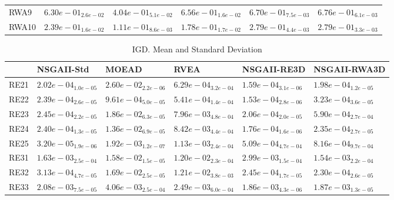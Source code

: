 \documentclass{article}
\begin{document}
\begin{table}
\begin{scriptsize}
\begin{tabular}{llllll}
RWA9 & $  6.30e-01_{ 2.6e-02}$ & $  4.04e-01_{ 5.1e-02}$ & $  6.56e-01_{ 1.6e-02}$ & \cellcolor{gray25}$  6.70e-01_{ 7.5e-03}$ & \cellcolor{gray95}$  6.76e-01_{ 6.1e-03}$ \\
RWA10 & $  2.39e-01_{ 1.6e-02}$ & $  1.11e-01_{ 8.6e-03}$ & $  1.78e-01_{ 1.7e-02}$ & \cellcolor{gray25}$  2.79e-01_{ 4.4e-03}$ & \cellcolor{gray95}$  2.79e-01_{ 3.3e-03}$ \\
\hline
\end{tabular}
\end{scriptsize}
\end{table}

\begin{table}
\caption{IGD. Mean and Standard Deviation}
\label{table: IGD}
\centering
\begin{scriptsize}
\begin{tabular}{llllll}
\hline & NSGAII-Std & MOEAD & RVEA & NSGAII-RE3D &  NSGAII-RWA3D\\
\hline 
RE21 & $  2.02e-04_{ 1.0e-05}$ & $  2.60e-02_{ 2.2e-06}$ & $  6.29e-04_{ 3.2e-04}$ & \cellcolor{gray95}$  1.59e-04_{ 3.1e-06}$ & \cellcolor{gray25}$  1.98e-04_{ 1.2e-05}$ \\
RE22 & \cellcolor{gray25}$  2.39e-04_{ 2.6e-05}$ & $  9.61e-04_{ 5.0e-05}$ & $  5.41e-04_{ 1.4e-04}$ & \cellcolor{gray95}$  1.53e-04_{ 2.8e-06}$ & $  3.23e-04_{ 3.6e-05}$ \\
RE23 & \cellcolor{gray25}$  2.45e-04_{ 2.2e-05}$ & $  1.86e-02_{ 6.3e-05}$ & $  7.96e-03_{ 4.8e-04}$ & \cellcolor{gray95}$  2.06e-04_{ 2.0e-05}$ & $  5.90e-04_{ 2.7e-04}$ \\
RE24 & $  2.40e-04_{ 1.3e-05}$ & $  1.36e-02_{ 6.9e-05}$ & $  8.42e-03_{ 4.4e-04}$ & \cellcolor{gray95}$  1.76e-04_{ 1.6e-06}$ & \cellcolor{gray25}$  2.35e-04_{ 2.7e-05}$ \\
RE25 & \cellcolor{gray95}$  3.20e-05_{ 1.9e-06}$ & $  1.92e-03_{ 1.2e-07}$ & $  1.13e-03_{ 2.4e-04}$ & \cellcolor{gray25}$  5.09e-04_{ 4.7e-04}$ & $  8.16e-04_{ 9.7e-04}$ \\
RE31 & \cellcolor{gray25}$  1.63e-03_{ 2.5e-04}$ & $  1.58e-02_{ 1.5e-05}$ & $  1.20e-02_{ 2.3e-04}$ & $  2.99e-03_{ 1.5e-04}$ & \cellcolor{gray95}$  1.54e-03_{ 2.2e-04}$ \\
RE32 & $  3.13e-04_{ 4.7e-05}$ & $  1.69e-02_{ 2.5e-05}$ & $  1.21e-02_{ 3.8e-03}$ & \cellcolor{gray25}$  2.45e-04_{ 1.7e-05}$ & \cellcolor{gray95}$  2.30e-04_{ 2.6e-05}$ \\
RE33 & $  2.08e-03_{ 7.5e-05}$ & $  4.06e-03_{ 2.5e-04}$ & $  2.49e-03_{ 6.0e-04}$ & \cellcolor{gray95}$  1.86e-03_{ 4.3e-06}$ & \cellcolor{gray25}$  1.87e-03_{ 1.3e-05}$ \\

\end{tabular}
\end{scriptsize}
\end{table}
\end{document}

